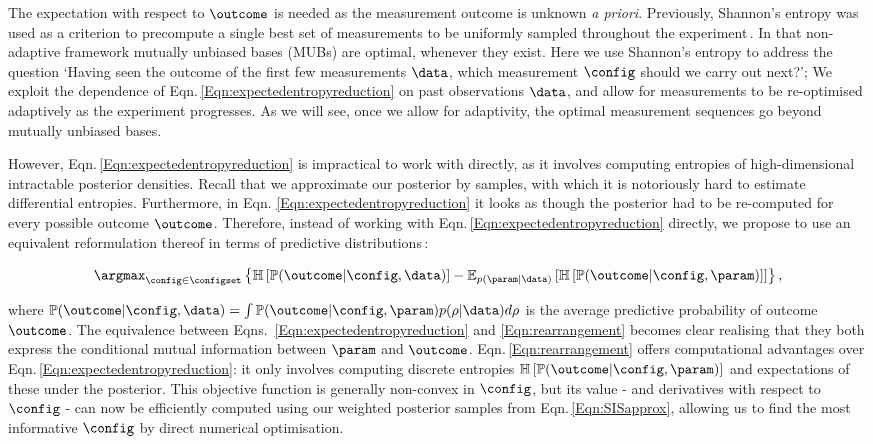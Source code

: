 The expectation with respect to $\outcome$ is needed as the measurement outcome is unknown \emph{a priori}. 
Previously, Shannon's entropy was used as a criterion to precompute a single best set of measurements to be uniformly sampled throughout the experiment\,\citep{MUBFirst,ExactInformation}. In that non-adaptive framework mutually unbiased bases (MUBs) are optimal, whenever they exist. Here we use Shannon's entropy to address the question `Having seen the outcome of the first few measurements $\data$, which measurement $\config$ should we carry out next?'; We exploit the dependence of Eqn.\,\eqref{Eqn:expectedentropyreduction} on past observations $\data$, and allow for measurements to be re-optimised adaptively as the experiment progresses. As we will see, once we allow for adaptivity, the optimal measurement sequences go beyond mutually unbiased bases.

However, Eqn.\,\eqref{Eqn:expectedentropyreduction}  is impractical to work with directly, as it involves computing entropies of high-dimensional intractable posterior densities. Recall that we approximate our posterior by samples, with which it is notoriously hard to estimate differential entropies. Furthermore, in Eqn. \eqref{Eqn:expectedentropyreduction}  it looks as though the posterior had to be re-computed for every possible outcome $\outcome$. Therefore, instead of working with Eqn.\,\eqref{Eqn:expectedentropyreduction} directly, we propose to use an equivalent reformulation thereof in terms of predictive distributions\,\citep{ExactInformation}:

\begin{equation}
\argmax_{\config\in\configset} \left\{ \mathbb{H}\left[\mathbb{P}(\outcome|\config,\data)\right] - \mathbb{E}_{p(\param\vert\data)}\left[\mathbb{H}\left[ \mathbb{P}(\outcome|\config,\param) \right] \right]\right\}\label{Eqn:rearrangement},
\end{equation}

where $\mathbb{P}(\outcome|\config,\data) = \int \mathbb{P}(\outcome|\config,\param) p(\rho\vert \data) d\rho$ is the average predictive probability of outcome $\outcome$. The equivalence between Eqns.\, \eqref{Eqn:expectedentropyreduction} and \eqref{Eqn:rearrangement} becomes clear realising that they both express the conditional mutual information between $\param$ and $\outcome$. Eqn.\,\eqref{Eqn:rearrangement} offers computational advantages over Eqn.\,\eqref{Eqn:expectedentropyreduction}: it only involves computing discrete entropies $\mathbb{H}\left[ \mathbb{P}(\outcome|\config,\param) \right]$ and expectations of these under the posterior. This objective function is generally non-convex in $\config$, but its value - and derivatives with respect to $\config$ - can now be efficiently computed using our weighted posterior samples from Eqn.\,\eqref{Eqn:SISapprox}, allowing us to find the most informative $\config$ by direct numerical optimisation.

